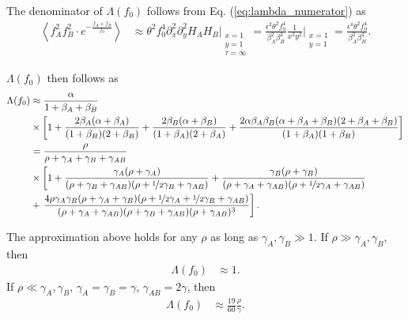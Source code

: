 \documentclass[11pt]{article}
\begin{document}
The denominator of $\Lambda(f_0)$ follows from Eq. (\ref{eq:lambda_numerator}) as 
\begin{align}
    \left\langle f_A^2f_B^2\cdot e^{-\frac{f_{A}+f_{B}}{f_0}}\right\rangle &\approx \theta^2 f_0^4 \partial_x^2 \partial_y^2 H_A H_B \Bigg\vert_{\substack{x=1 \\ y=1 \\ \tau=\infty}} = \frac{\epsilon^2 \theta^2 f_0^4}{\beta_A^2 \beta_B^2} \frac{1}{x^2y^2}\Bigg\vert_{\substack{x=1 \\ y=1}} = \frac{\epsilon^4 \theta^2 f_0^4}{\beta_A^2 \beta_B^2}.
\end{align}

$\Lambda(f_0)$ then follows as
\begin{align}\label{eq:lambda_strong_s}
    \Lambda(f_0) &\approx \frac{\alpha}{1+\beta_A + \beta_B} \\ \nonumber
    &\times \left[1 +  \frac{2\beta_A(\alpha+\beta_A)}{(1+\beta_B)(2+\beta_B)}
    +\frac{2\beta_B(\alpha+\beta_B)}{(1+\beta_A)(2+\beta_A)} + \frac{2 \alpha \beta_A \beta_B (\alpha+\beta_A+\beta_B)(2+\beta_A+\beta_B)}{(1+\beta_A)(1+\beta_B)}\right] \\ \nonumber
    &= \frac{\rho}{\rho + \gamma_A + \gamma_B + \gamma_{AB}} \\\nonumber
    &\times \left[1 +\frac{\gamma_A(\rho + \gamma_{A})}{(\rho + \gamma_B + \gamma_{AB})(\rho + \nicefrac{1}{2}\gamma_B + \gamma_{AB})} 
    +\frac{\gamma_B(\rho + \gamma_{B})}{(\rho + \gamma_A + \gamma_{AB})(\rho + \nicefrac{1}{2}\gamma_A + \gamma_{AB})} \right. \\ \nonumber
    &+\left. \frac{4 \rho \gamma_A \gamma_B (\rho+\gamma_A+\gamma_B)(\rho+\nicefrac{1}{2}\gamma_A+\nicefrac{1}{2}\gamma_B+\gamma_{AB})}{(\rho+\gamma_A+\gamma_{AB})(\rho+\gamma_B+\gamma_{AB})(\rho+\gamma_{AB})^3}\right].
\end{align}

The approximation above holds for any $\rho$ as long as $\gamma_{A}, \gamma_{B} \gg 1$. If $\rho \gg \gamma_A, \gamma_B$, then 
\begin{align}
    \Lambda(f_0) &\approx 1.
\end{align}
If $\rho \ll \gamma_A, \gamma_B$, $\gamma_A=\gamma_B=\gamma$, $\gamma_{AB}=2\gamma$, then
\begin{align}
    \Lambda(f_0) &\approx \frac{19}{60}\frac{\rho}{\gamma}.
\end{align}
\end{document}
